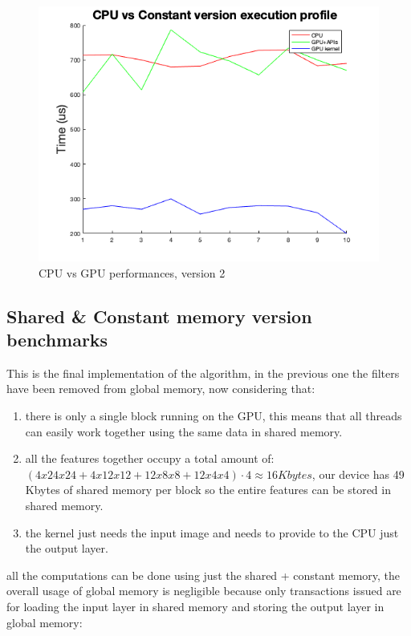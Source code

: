 \documentclass[a4paper]{report}
\begin{document}
\begin{figure}[!h]
\centering
\includegraphics[scale=0.5]{docs/cpuVSconstant.png} 
\caption{CPU vs GPU performances, version 2}
\label{fig_gpu2}
\end{figure}

\subsection{Shared \& Constant memory version benchmarks}
This is the final implementation of the algorithm, in the previous one the filters have been removed from global memory, now considering that:

\begin{enumerate}
\item there is only a single block running on the GPU, this means that all threads can easily work together using the same data in shared memory.
\item all the features together occupy a total amount of: \( (4x24x24 + 4x12x12 + 12x8x8 + 12x4x4) \cdot 4  \approx 16 Kbytes\), our device has 49 Kbytes of shared memory per block so the entire features can be stored in shared memory.
\item the kernel just needs the input image and needs to provide to the CPU just the output layer.
\end{enumerate}

all the computations can be done using just the shared + constant memory, the overall usage of global memory is negligible because only transactions issued are for loading the input layer in shared memory and storing the output layer in global memory:
\end{document}
